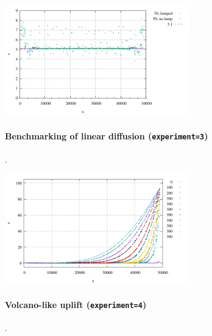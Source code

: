 \begin{center}
\includegraphics[width=8cm]{python_codes/fieldstone_140/results/exp2/elevation}
\end{center}

\paragraph{Benchmarking of linear diffusion ({\tt experiment=3})}.

\begin{center}
\includegraphics[width=8cm]{python_codes/fieldstone_140/results/exp3/elevation}
\end{center}

\paragraph{Volcano-like uplift ({\tt experiment=4})}.

